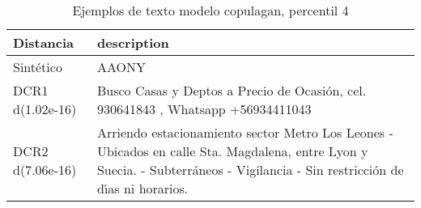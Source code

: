 \begin{table}[H]
\centering
\fontsize{10}{14}\selectfont
\caption{Ejemplos de texto modelo copulagan, percentil 4}
\label{table-example-economicos-b-3-copulagan-4p-text}
\begin{tabular}{|l|m{35em}|}
\hline
\rowcolor[gray]{0.8}
Distancia & description \\
\hline Sintético & AAONY \\
\hline DCR1 d(1.02e-16) & Busco Casas y Deptos a Precio de Ocasi\'on, cel. 930641843 , Whatsapp +56934411043  \\
\hline DCR2 d(7.06e-16) & Arriendo estacionamiento sector Metro Los Leones
- Ubicados en calle Sta. Magdalena, entre Lyon y Suecia. 
- Subterr\'aneos
- Vigilancia
- Sin restricci\'on de d{\'\i}as ni horarios.  \\
\hline
\end{tabular}
\end{table}
